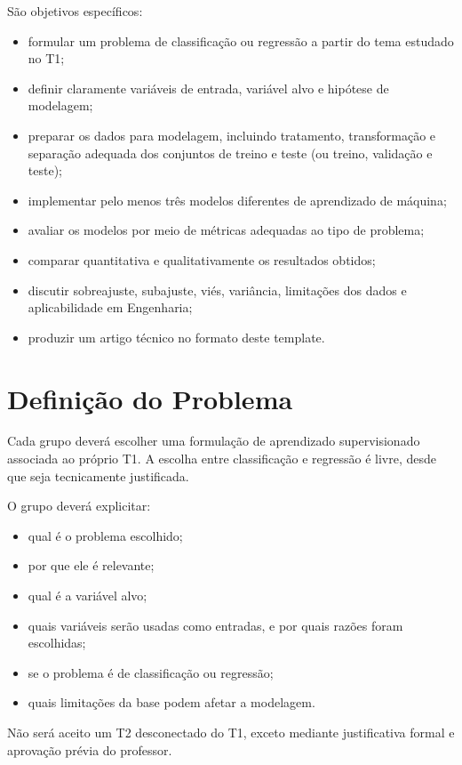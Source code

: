 \documentclass[a4paper]{ifacconf}
\begin{document}
São objetivos específicos:
\begin{itemize}
    \item formular um problema de classificação ou regressão a partir do tema estudado no T1;
    \item definir claramente variáveis de entrada, variável alvo e hipótese de modelagem;
    \item preparar os dados para modelagem, incluindo tratamento, transformação e separação adequada dos conjuntos de treino e teste (ou treino, validação e teste);
    \item implementar pelo menos três modelos diferentes de aprendizado de máquina;
    \item avaliar os modelos por meio de métricas adequadas ao tipo de problema;
    \item comparar quantitativa e qualitativamente os resultados obtidos;
    \item discutir sobreajuste, subajuste, viés, variância, limitações dos dados e aplicabilidade em Engenharia;
    \item produzir um artigo técnico no formato deste template.
\end{itemize}


\section{Definição do Problema}

Cada grupo deverá escolher uma formulação de aprendizado supervisionado associada ao próprio T1. A escolha entre classificação e regressão é livre, desde que seja tecnicamente justificada.

O grupo deverá explicitar:
\begin{itemize}
    \item qual é o problema escolhido;
    \item por que ele é relevante;
    \item qual é a variável alvo;
    \item quais variáveis serão usadas como entradas, e por quais razões foram escolhidas;
    \item se o problema é de classificação ou regressão;
    \item quais limitações da base podem afetar a modelagem.
\end{itemize}

Não será aceito um T2 desconectado do T1, exceto mediante justificativa formal e aprovação prévia do professor.
\end{document}
